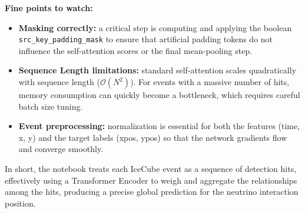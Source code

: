 \documentclass[11pt,a4paper]{article}
\begin{document}
\textbf{Fine points to watch:}

\begin{itemize}
    \item \textbf{Masking correctly:} a critical step is computing and applying the boolean \texttt{src\_key\_padding\_mask} to ensure that artificial padding tokens do not influence the self-attention scores or the final mean-pooling step.
    \item \textbf{Sequence Length limitations:} standard self-attention scales quadratically with sequence length ($\mathcal{O}(N^2)$). For events with a massive number of hits, memory consumption can quickly become a bottleneck, which requires careful batch size tuning.
    \item \textbf{Event preprocessing:} normalization is essential for both the features (time, x, y) and the target labels (xpos, ypos) so that the network gradients flow and converge smoothly.
\end{itemize}

In short, the notebook treats each IceCube event as a sequence of detection hits, effectively using a Transformer Encoder to weigh and aggregate the relationships among the hits, producing a precise global prediction for the neutrino interaction position.
\end{document}
